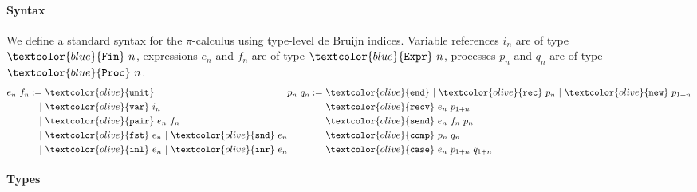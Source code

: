\documentclass[sigplan,screen,review]{acmart}
\newcommand{\picalc}{$\pi$-calculus}
\newcommand{\constr}[1]{\textcolor{olive}{\mathtt{#1}}}
\newcommand{\type}[1]{\textcolor{blue}{\mathtt{#1}}}
\newcommand{\Fin}[1]{\type{Fin}~#1}
\newcommand{\sExpr}[1]{\type{Expr}~#1}
\newcommand{\sProc}[1]{\type{Proc}~#1}
\newcommand{\sunit}{\constr{unit}}
\newcommand{\svar}{\constr{var}}
\newcommand{\sfst}{\constr{fst}}
\newcommand{\ssnd}{\constr{snd}}
\newcommand{\sinl}{\constr{inl}}
\newcommand{\sinr}{\constr{inr}}
\newcommand{\spair}{\constr{pair}}
\newcommand{\send}{\constr{end}}
\newcommand{\snew}{\constr{new}}
\newcommand{\scomp}{\constr{comp}}
\newcommand{\srecv}{\constr{recv}}
\newcommand{\ssend}{\constr{send}}
\newcommand{\scase}{\constr{case}}
\newcommand{\srec}{\constr{rec}}
\begin{document}
\paragraph{Syntax}
\label{syntax}

We define a standard syntax for the \picalc{} using type-level de Bruijn indices.
Variable references $i_n$ are of type $\Fin{n}$, expressions $e_n$ and $f_n$ are of type $\sExpr{n}$, processes $p_n$ and $q_n$ are of type $\sProc{n}$.
\[
\begin{aligned}[c]
  e_n ~ f_n  :=
  &~ \sunit \\
  |&~ \svar~i_n \\
  |&~ \spair~e_n~f_n \\
  |&~ \sfst~e_n ~|~  \ssnd~e_n \\
  |&~ \sinl~e_n ~|~  \sinr~e_n
\end{aligned}
\begin{aligned}[c]
  p_n ~ q_n  :=
  &~ \send ~|~  \srec~p_n ~|~ \snew~p_{1+n} \\
  |&~ \srecv~e_n~p_{1+n} \\
  |&~ \ssend~e_n~f_n~p_n \\
  |&~ \scomp~p_n~q_n \\
  |&~ \scase~e_n~p_{1+n}~q_{1+n} \\
\end{aligned}
\]

\paragraph{Types}
\label{types}
\end{document}
